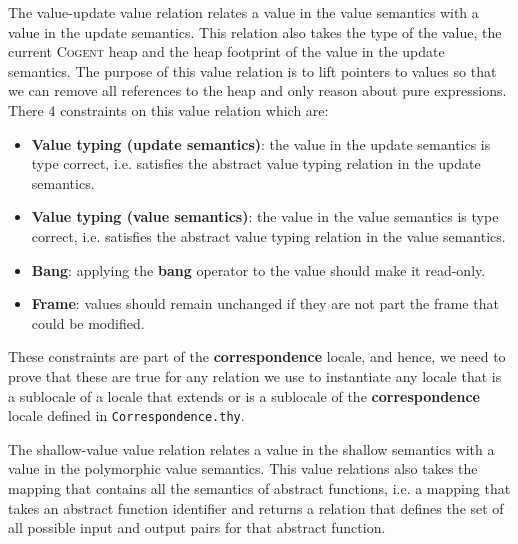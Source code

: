 \documentclass{article}
\newcommand{\cogent}{\textsc{Cogent}\xspace}
\begin{document}
The value-update value relation relates a value in the value semantics with
a value in the update semantics.
This relation also takes the type of the value, the current \cogent heap
and the heap footprint of the value in the update semantics.
The purpose of this value relation is to lift pointers to values so that we
can remove all references to the heap and only reason about pure
expressions.
There 4 constraints on this value relation which are:
\begin{itemize}
\item \textbf{Value typing (update semantics)}: the value in the update
semantics is type correct, i.e. satisfies the abstract value typing
relation in the update semantics.
\item \textbf{Value typing (value semantics)}: the value in the value
semantics is type correct, i.e. satisfies the abstract value typing
relation in the value semantics.
\item \textbf{Bang}: applying the \textbf{bang} operator to the value
should make it read-only.
\item \textbf{Frame}: values should remain unchanged if they are not part
the frame that could be modified.
\end{itemize}
These constraints are part of the \textbf{correspondence} locale, and hence, 
we need to prove that these are true for any relation we use to instantiate
any locale that is a sublocale of a locale that extends or is a sublocale
of the \textbf{correspondence} locale defined in
\texttt{Correspondence.thy}.

The shallow-value value relation relates a value in the shallow semantics
with a value in the polymorphic value semantics.
This value relations also takes the mapping that contains all the semantics
of abstract functions,
i.e. a mapping that takes an abstract function identifier and returns a
relation that defines the set of all possible input and output pairs for
that abstract function.
\end{document}
